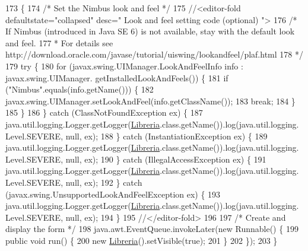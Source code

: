 \begin{DoxyCode}
173                                            \{
174         \textcolor{comment}{/* Set the Nimbus look and feel */}
175         \textcolor{comment}{//<editor-fold defaultstate="collapsed" desc=" Look and feel setting code (optional) ">}
176         \textcolor{comment}{/* If Nimbus (introduced in Java SE 6) is not available, stay with the default look and feel.}
177 \textcolor{comment}{         * For details see http://download.oracle.com/javase/tutorial/uiswing/lookandfeel/plaf.html }
178 \textcolor{comment}{         */}
179         \textcolor{keywordflow}{try} \{
180             \textcolor{keywordflow}{for} (javax.swing.UIManager.LookAndFeelInfo info : javax.swing.UIManager.
      getInstalledLookAndFeels()) \{
181                 \textcolor{keywordflow}{if} (\textcolor{stringliteral}{"Nimbus"}.equals(info.getName())) \{
182                     javax.swing.UIManager.setLookAndFeel(info.getClassName());
183                     \textcolor{keywordflow}{break};
184                 \}
185             \}
186         \} \textcolor{keywordflow}{catch} (ClassNotFoundException ex) \{
187             java.util.logging.Logger.getLogger(\mbox{\hyperlink{classpecl2ignacioribera_1_1_libreria_afb8a78e297254074dcc5c35d5c5e00e9}{Libreria}}.class.getName()).log(java.util.logging.
      Level.SEVERE, null, ex);
188         \} \textcolor{keywordflow}{catch} (InstantiationException ex) \{
189             java.util.logging.Logger.getLogger(\mbox{\hyperlink{classpecl2ignacioribera_1_1_libreria_afb8a78e297254074dcc5c35d5c5e00e9}{Libreria}}.class.getName()).log(java.util.logging.
      Level.SEVERE, null, ex);
190         \} \textcolor{keywordflow}{catch} (IllegalAccessException ex) \{
191             java.util.logging.Logger.getLogger(\mbox{\hyperlink{classpecl2ignacioribera_1_1_libreria_afb8a78e297254074dcc5c35d5c5e00e9}{Libreria}}.class.getName()).log(java.util.logging.
      Level.SEVERE, null, ex);
192         \} \textcolor{keywordflow}{catch} (javax.swing.UnsupportedLookAndFeelException ex) \{
193             java.util.logging.Logger.getLogger(\mbox{\hyperlink{classpecl2ignacioribera_1_1_libreria_afb8a78e297254074dcc5c35d5c5e00e9}{Libreria}}.class.getName()).log(java.util.logging.
      Level.SEVERE, null, ex);
194         \}
195         \textcolor{comment}{//</editor-fold>}
196 
197         \textcolor{comment}{/* Create and display the form */}
198         java.awt.EventQueue.invokeLater(\textcolor{keyword}{new} Runnable() \{
199             \textcolor{keyword}{public} \textcolor{keywordtype}{void} run() \{
200                 \textcolor{keyword}{new} \mbox{\hyperlink{classpecl2ignacioribera_1_1_libreria_afb8a78e297254074dcc5c35d5c5e00e9}{Libreria}}().setVisible(\textcolor{keyword}{true});
201             \}
202         \});
203     \}
\end{DoxyCode}


